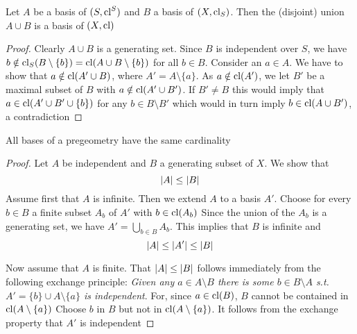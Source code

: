 \documentclass[11pt]{article}
\begin{document}
\begin{remark}
\label{reC.1.5}
Let \(A\) be a basis of \((S,\operatorname{\text{cl}}^S)\) and \(B\) a basis of \((X,\operatorname{\text{cl}}_S)\). Then the (disjoint)
union \(A\cup B\) is a basis of \((X,\operatorname{\text{cl}})\)
\end{remark}

\begin{proof}
Clearly \(A\cup B\) is a generating set.
Since \(B\) is independent over \(S\), we
have \(b\notin\operatorname{\text{cl}}_S(B\setminus\{b\})=\operatorname{\text{cl}}(A\cup B\setminus\{b\})\) for all \(b\in B\). Consider an \(a\in A\). We have to show
that \(a\notin\operatorname{\text{cl}}(A'\cup B)\), where \(A'=A\setminus\{a\}\). As \(a\notin\operatorname{\text{cl}}(A')\), we let \(B'\) be a maximal subset
of \(B\) with \(a\notin\operatorname{\text{cl}}(A'\cup B')\). If \(B'\neq B\) this would imply that \(a\in\operatorname{\text{cl}}(A'\cup B'\cup\{b\})\) for
any \(b\in B\setminus B'\) which would in turn imply \(b\in\operatorname{\text{cl}}(A\cup B')\), a contradiction
\end{proof}

\begin{lemma}[]
All bases of a pregeometry have the same cardinality
\end{lemma}

\begin{proof}
Let \(A\) be independent and \(B\) a generating subset of \(X\). We show that
\begin{equation*}
\abs{A}\le\abs{B}
\end{equation*}
Assume first that \(A\) is infinite. Then we extend \(A\) to a basis \(A'\). Choose for
every \(b\in B\) a finite subset \(A_b\) of \(A'\) with \(b\in\operatorname{\text{cl}}(A_b)\)
Since the union of
the \(A_b\) is a generating set, we have \(A'=\bigcup_{b\in B}A_b\). This implies that \(B\) is infinite
and
\begin{equation*}
\abs{A}\le\abs{A'}\le\abs{B}
\end{equation*}

Now assume that \(A\) is finite. That \(\abs{A}\le\abs{B}\) follows immediately from the following
exchange principle: \emph{Given any \(a\in A\setminus B\) there is some \(b\in B\setminus A\) s.t. \(A'=\{b\}\cup A\setminus\{a\}\) is
independent}. For, since \(a\in\operatorname{\text{cl}}(B)\), \(B\) cannot be contained in \(\operatorname{\text{cl}}(A\setminus\{a\})\)
Choose \(b\) in \(B\) but not in \(\operatorname{\text{cl}}(A\setminus\{a\})\). It follows from the exchange property that \(A'\) is
independent
\end{proof}
\end{document}
